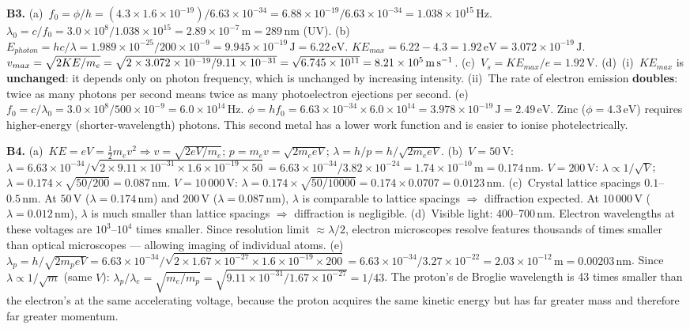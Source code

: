 \textbf{B3.}
(a)~$f_0=\phi/h
=(4.3\times1.6\times10^{-19})/6.63\times10^{-34}
=6.88\times10^{-19}/6.63\times10^{-34}
=1.038\times10^{15}\,\text{Hz}$.
$\lambda_0=c/f_0=3.0\times10^8/1.038\times10^{15}
=2.89\times10^{-7}\,\text{m}=289\,\text{nm}$
(UV). \quad
(b)~$E_{photon}=hc/\lambda=1.989\times10^{-25}/200
\times10^{-9}=9.945\times10^{-19}\,\text{J}
=6.22\,\text{eV}$.
$KE_{max}=6.22-4.3=1.92\,\text{eV}
=3.072\times10^{-19}\,\text{J}$.
$v_{max}=\sqrt{2KE/m_e}
=\sqrt{2\times3.072\times10^{-19}/9.11\times10^{-31}}
=\sqrt{6.745\times10^{11}}
=8.21\times10^5\,\text{m\,s}^{-1}$. \quad
(c)~$V_s=KE_{max}/e=1.92\,\text{V}$. \quad
(d)~(i)~$KE_{max}$ is \textbf{unchanged}: it depends
only on photon frequency, which is unchanged by
increasing intensity.
(ii)~The rate of electron emission \textbf{doubles}:
twice as many photons per second means twice as many
photoelectron ejections per second. \quad
(e)~$f_0=c/\lambda_0=3.0\times10^8/500\times10^{-9}
=6.0\times10^{14}\,\text{Hz}$.
$\phi=hf_0=6.63\times10^{-34}\times6.0\times10^{14}
=3.978\times10^{-19}\,\text{J}=2.49\,\text{eV}$.
Zinc ($\phi=4.3\,\text{eV}$) requires higher-energy
(shorter-wavelength) photons. This second metal has a
lower work function and is easier to ionise
photelectrically.

\textbf{B4.}
(a)~$KE=eV=\tfrac{1}{2}m_ev^2\Rightarrow
v=\sqrt{2eV/m_e}$; $p=m_ev=\sqrt{2m_eeV}$;
$\lambda=h/p=h/\sqrt{2m_eeV}$. \checkmark \quad
(b)~$V=50\,\text{V}$:
$\lambda=6.63\times10^{-34}/\sqrt{2\times9.11
\times10^{-31}\times1.6\times10^{-19}\times50}
=6.63\times10^{-34}/3.82\times10^{-24}
=1.74\times10^{-10}\,\text{m}=0.174\,\text{nm}$.
$V=200\,\text{V}$: $\lambda\propto1/\sqrt{V}$;
$\lambda=0.174\times\sqrt{50/200}=0.087\,\text{nm}$.
$V=10\,000\,\text{V}$: $\lambda=0.174
\times\sqrt{50/10000}=0.174\times0.0707
=0.0123\,\text{nm}$. \quad
(c)~Crystal lattice spacings $0.1$--$0.5\,\text{nm}$.
At $50\,\text{V}$ ($\lambda=0.174\,\text{nm}$) and
$200\,\text{V}$ ($\lambda=0.087\,\text{nm}$),
$\lambda$ is comparable to lattice spacings
$\Rightarrow$ diffraction expected.
At $10\,000\,\text{V}$ ($\lambda=0.012\,\text{nm}$),
$\lambda$ is much smaller than lattice spacings
$\Rightarrow$ diffraction is negligible. \quad
(d)~Visible light: 400--700\,nm. Electron wavelengths
at these voltages are $10^3$--$10^4$ times smaller.
Since resolution limit $\approx\lambda/2$, electron
microscopes resolve features thousands of times smaller
than optical microscopes --- allowing imaging of
individual atoms. \quad
(e)~$\lambda_p=h/\sqrt{2m_peV}
=6.63\times10^{-34}/\sqrt{2\times1.67\times10^{-27}
\times1.6\times10^{-19}\times200}
=6.63\times10^{-34}/3.27\times10^{-22}
=2.03\times10^{-12}\,\text{m}=0.00203\,\text{nm}$.
Since $\lambda\propto1/\sqrt{m}$ (same $V$):
$\lambda_p/\lambda_e=\sqrt{m_e/m_p}
=\sqrt{9.11\times10^{-31}/1.67\times10^{-27}}
=1/43$.
The proton's de Broglie wavelength is 43 times
smaller than the electron's at the same accelerating
voltage, because the proton acquires the same kinetic
energy but has far greater mass and therefore far
greater momentum.

